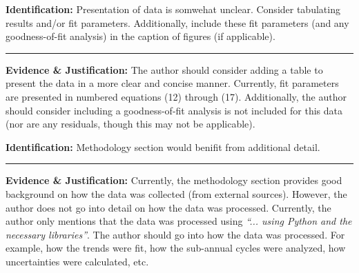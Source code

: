 \documentclass[%
 aip,
cp,  %
 amsmath,amssymb,
 reprint,%
nofootinbib
]{revtex4-2}
\begin{document}
\begin{mdframed}
    \textbf{Identification:}
    Presentation of data is somwehat unclear. Consider tabulating results and/or fit parameters. Additionally, include these fit parameters (and any goodness-of-fit analysis) in the caption of figures (if applicable).
    \begin{center}
        \noindent\rule{0.9\textwidth}{0.5pt}
    \end{center}
    \textbf{Evidence \& Justification:}
    The author should consider adding a table to present the data in a more clear and concise manner. Currently, fit parameters are presented in numbered equations (12) through (17). Additionally, the author should consider including a goodness-of-fit analysis is not included for this data (nor are any residuals, though this may not be applicable).
\end{mdframed}


\begin{mdframed}
    \textbf{Identification:}
    Methodology section would benifit from additional detail.
    \begin{center}
        \noindent\rule{0.9\textwidth}{0.5pt}
    \end{center}
    \textbf{Evidence \& Justification:}
    Currently, the methodology section provides good background on how the data was collected (from external sources). However, the author does not go into detail on how the data was processed. Currently, the author only mentions that the data was processed using \textit{``... using Python and the necessary libraries''}. The author should go into how the data was processed. For example, how the trends were fit, how the sub-annual cycles were analyzed, how uncertainties were calculated, etc.
\end{mdframed}
\end{document}
